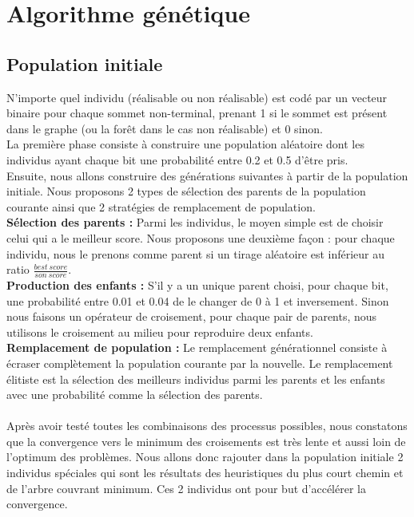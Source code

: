 \documentclass[12pt,a4paper]{article}
\begin{document}
\section{Algorithme génétique}
\subsection{Population initiale}
N'importe quel individu (réalisable ou non réalisable) est codé par un vecteur binaire pour chaque sommet non-terminal, prenant 1 si le sommet est présent dans le graphe (ou la forêt dans le cas non réalisable) et 0 sinon.\\
La première phase consiste à construire une population aléatoire dont les individus ayant chaque bit une probabilité entre 0.2 et 0.5 d'être pris.\\
Ensuite, nous allons construire des générations suivantes à partir de la population initiale. Nous proposons 2 types de sélection des parents de la population courante ainsi que 2 stratégies de remplacement de population.\\
\textbf{Sélection des parents : }Parmi les individus, le moyen simple est de choisir celui qui a le meilleur score. Nous proposons une deuxième façon : pour chaque individu, nous le prenons comme parent si un tirage aléatoire est inférieur au ratio $\frac{best\ score}{son\ score}$.\\
\textbf{Production des enfants : } S'il y a un unique parent choisi, pour chaque bit, une probabilité entre 0.01 et 0.04 de le changer de 0 à 1 et inversement. Sinon nous faisons un opérateur de croisement, pour chaque pair de parents, nous utilisons le croisement au milieu pour reproduire deux enfants.\\
\textbf{Remplacement de population : } Le remplacement générationnel consiste à écraser complètement la population courante par la nouvelle. Le remplacement élitiste est la sélection des meilleurs individus parmi les parents et les enfants avec une probabilité comme la sélection des parents. \\\\
Après avoir testé toutes les combinaisons des processus possibles, nous constatons que la convergence vers le minimum des croisements est très lente et aussi loin de l'optimum des problèmes. Nous allons donc rajouter dans la population initiale 2 individus spéciales qui sont les résultats des heuristiques du plus court chemin et de l'arbre couvrant minimum. Ces 2 individus ont pour but d'accélérer la convergence.
\end{document}
